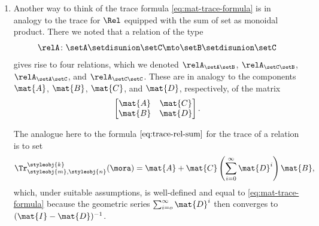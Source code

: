 \begin{remark}
\begin{enumerate}
              \begin{equation}\label{eq:mat-fixpoint-output-equation}
                  \mat{y} = \mat{A} \mat{u} + \mat{C}\mat{x}
              \end{equation}
              where $\mat{x}$ is required to satisfy the recursive equation
              \begin{equation}
                  \mat{x} = \mat{B}\mat{u} + \mat{D} \mat{x}
              \end{equation}
              which, if $\mat{I} - \mat{D}$ is invertible, may be solved thus:
              \begin{equation}
                  \mat{x} = (\mat{I} - \mat{D})^{-1}\mat{B}\mat{u}.
              \end{equation}
              Substituting this formula in \cref{eq:mat-fixpoint-output-equation}, we obtain
              \begin{equation}
                  \mat{y} = \mat{A}\mat{u} + \mat{C}(\mat{I} - \mat{D})^{-1}\mat{B}\mat{u}
              \end{equation}
        \item
              Another way to think of the trace formula \cref{eq:mat-trace-formula} is in analogy to the trace for $\Rel$ equipped with the sum of set as monoidal product.
              There we noted that a relation of the type
              \begin{equation}
                  \relA \colon \setA \setdisunion \setC \mto \setB \setdisunion \setC
              \end{equation}
              gives rise to four relations, which we denoted $\relA_{\setA \setB}$, $\relA_{\setC \setB}$, $\relA_{\setA \setC}$, and $\relA_{\setC \setC}$.
              These are in analogy to the components $\mat{A}$, $\mat{B}$, $\mat{C}$, and $\mat{D}$, respectively, of the matrix
              \begin{equation}
                  \begin{bmatrix}
                      \mat{A} & \mat{C} \\
                      \mat{B} & \mat{D}
                  \end{bmatrix}.
              \end{equation}

              The analogue here to the formula $\cref{eq:trace-rel-sum}$ for the trace of a relation is to set
              \begin{equation}
                  \Tr_{\styleobj{m},\styleobj{n}}^\styleobj{k} (\mora) = \mat{A} + \mat{C} \left( \sum_{i=0}^\infty \mat{D}^i \right) \mat{B},
              \end{equation}
              which, under suitable assumptions, is well-defined and equal to \cref{eq:mat-trace-formula} because the geometric series $\sum_{i=o}^\infty \mat{D}^i$ then converges to $(\mat{I} - \mat{D})^{-1}$.
    \end{enumerate}
\end{remark}


